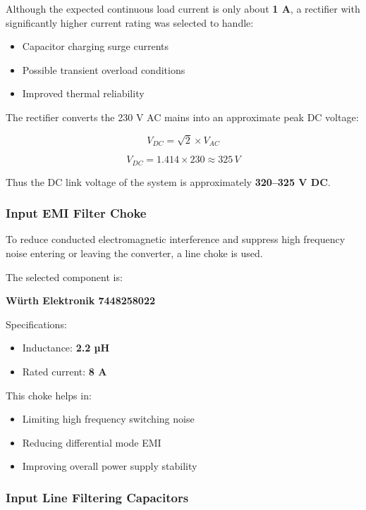 Although the expected continuous load current is only about \textbf{1 A}, a rectifier with significantly higher current rating was selected to handle:

\begin{itemize}
\item Capacitor charging surge currents
\item Possible transient overload conditions
\item Improved thermal reliability
\end{itemize}

The rectifier converts the 230 V AC mains into an approximate peak DC voltage:

\[
V_{DC} = \sqrt{2} \times V_{AC}
\]

\[
V_{DC} = 1.414 \times 230 \approx 325\,V
\]

Thus the DC link voltage of the system is approximately \textbf{320–325 V DC}.

\subsubsection{Input EMI Filter Choke}

To reduce conducted electromagnetic interference and suppress high frequency noise entering or leaving the converter, a line choke is used.

The selected component is:

\begin{center}
\textbf{Würth Elektronik 7448258022}
\end{center}

Specifications:

\begin{itemize}
\item Inductance: \textbf{2.2 µH}
\item Rated current: \textbf{8 A}
\end{itemize}

This choke helps in:

\begin{itemize}
\item Limiting high frequency switching noise
\item Reducing differential mode EMI
\item Improving overall power supply stability
\end{itemize}

\subsubsection{Input Line Filtering Capacitors}

